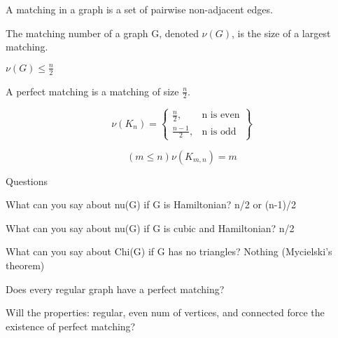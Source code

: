 
\begin{definition}[Matching]
    A matching in a graph is a set of pairwise non-adjacent edges.
\end{definition}

\begin{definition}
    The matching number of a graph G, denoted $\nu(G)$, is the size of a largest matching.
\end{definition}

\begin{proposition}
    $\nu(G) \leq \frac{n}{2}$
\end{proposition}

\begin{definition}
    A perfect matching is a matching of size $\frac{n}{2}$.
\end{definition}

\[
    \nu(K_n) = \left\{\begin{array}{lr}
        \frac{n}{2},    &   \text{n is even}\\
        \frac{n-1}{2},  &   \text{n is odd}
    \end{array}\right\}
\]

\[
    (m \leq n) \nu(K_{m,n}) = m
\]

Questions

    What can you say about nu(G) if G is Hamiltonian? n/2 or (n-1)/2
   
    What can you say about nu(G) if G is cubic and Hamiltonian? n/2
    
    What can you say about Chi(G) if G has no triangles? Nothing (Mycielski's theorem)
    
    Does every regular graph have a perfect matching?

    Will the properties: regular, even num of vertices, and connected force the existence of perfect matching?
